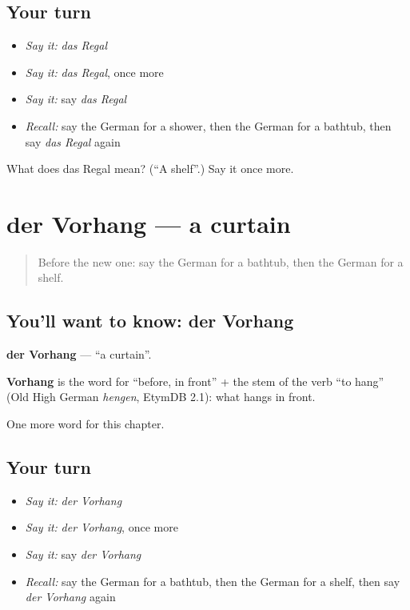 \subsection*{Your turn}
\begin{itemize}
\raggedright
  \item \emph{Say it:} \emph{das Regal}
  \item \emph{Say it:} \emph{das Regal}, once more
  \item \emph{Say it:} say \emph{das Regal}
  \item \emph{Recall:} say the German for a shower, then the German for a bathtub, then say \emph{das Regal} again
\end{itemize}

\begin{tcolorbox}[breakable,colback=teal!4,colframe=teal!35!black,title={Before you move on}]
What does das Regal mean? (\textquotedblleft{}A shelf\textquotedblright{}.) Say it once more.
\end{tcolorbox}
\section[der Vorhang]{der Vorhang — a curtain}

\label{lesson:GE-C113-vorhang}



\begin{quote}
Before the new one: say the German for a bathtub, then the German for a shelf.
\end{quote}

\subsection*{You'll want to know: der Vorhang}
\textbf{der Vorhang} — \textquotedblleft{}a curtain\textquotedblright{}.

\begin{cousinweb}
\textbf{Vorhang} is the word for \textquotedblleft{}before, in front\textquotedblright{} + the stem of the verb \textquotedblleft{}to hang\textquotedblright{} (Old High German \emph{hengen}, EtymDB 2.1): what hangs in front.
\end{cousinweb}

\begin{grammarlens}[title={What you've built}]
One more word for this chapter.
\end{grammarlens}

\subsection*{Your turn}
\begin{itemize}
\raggedright
  \item \emph{Say it:} \emph{der Vorhang}
  \item \emph{Say it:} \emph{der Vorhang}, once more
  \item \emph{Say it:} say \emph{der Vorhang}
  \item \emph{Recall:} say the German for a bathtub, then the German for a shelf, then say \emph{der Vorhang} again
\end{itemize}

